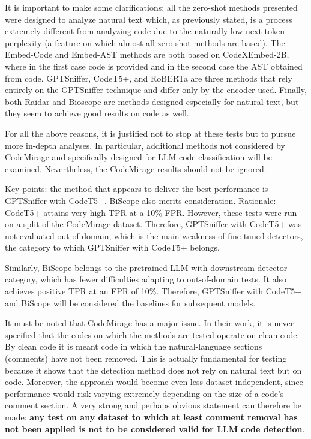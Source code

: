 It is important to make some clarifications: all the zero-shot 
methods presented were designed to analyze natural text which, 
as previously stated, is a process extremely different from 
analyzing code due to the naturally low next-token perplexity 
(a feature on which almost all zero-shot methods are based). 
The Embed-Code and Embed-AST methods are both based on 
CodeXEmbed-2B\cite{liu2024codexembed}, where in the first case code is provided and 
in the second case the AST obtained from code. GPTSniffer, 
CodeT5+, and RoBERTa are three methods that rely entirely on 
the GPTSniffer\cite{nguyen2024gptsniffer} technique and differ only by the encoder used. 
Finally, both Raidar and Bioscope are methods designed especially 
for natural text, but they seem to achieve good results on code as well.

For all the above reasons, it is justified not to stop at these tests but to pursue more in-depth analyses. In particular, additional methods not considered by CodeMirage and specifically designed for LLM code classification will be examined. Nevertheless, the CodeMirage results should not be ignored.

Key points: the method that appears to deliver the best performance 
is GPTSniffer with CodeT5+. BiScope also merits consideration. 
Rationale: CodeT5+ attains very high TPR at a 10\% 
FPR. However, these tests were run on a split of the 
CodeMirage dataset. Therefore, GPTSniffer with CodeT5+ 
was not evaluated out of domain, which is the main weakness 
of fine-tuned detectors, the category to which GPTSniffer with 
CodeT5+ belongs.

Similarly, BiScope belongs to the pretrained LLM with 
downstream detector category, which has fewer difficulties 
adapting to out-of-domain tests. It also achieves positive 
TPR at an FPR of 10\%. Therefore, GPTSniffer with 
CodeT5+ and BiScope will be considered the baselines 
for subsequent models.

It must be noted that CodeMirage has a major issue. In their work, 
it is never specified that the codes on which the methods are tested 
operate on clean code. By clean code it is meant code in which the 
natural-language sections (comments) have not been removed. 
This is actually fundamental for testing because it shows that the 
detection method does not rely on natural text but on code.
Moreover, the approach would become even less dataset-independent, 
since performance would risk varying extremely depending on the size 
of a code’s comment section.
A very strong and perhaps obvious statement can therefore be made: 
\textbf{any test on any dataset to which at least comment removal has not been 
applied is not to be considered valid for LLM code detection}.

